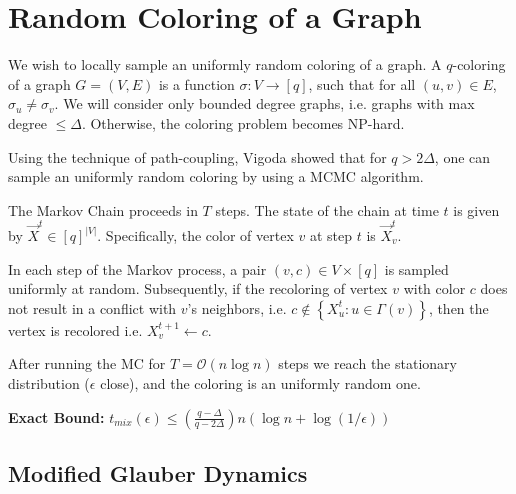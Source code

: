 \section{Random Coloring of a Graph}%
\label{sec:random_coloring_of_a_graph}

We wish to locally sample an uniformly random coloring of a graph.
A $q$-coloring of a graph $G = (V, E)$ is a function $\sigma : V\rightarrow [q]$,
such that for all $(u,v)\in E$, $\sigma_u \not= \sigma_v$.
We will consider only bounded degree graphs, i.e. graphs with max degree $\le \Delta$.
Otherwise, the coloring problem becomes NP-hard.

Using the technique of path-coupling, Vigoda  showed that for $q > 2\Delta$,
one can sample an uniformly random coloring by using a MCMC algorithm.

The Markov Chain proceeds in $T$ steps. The state of the chain at time $t$ is given by $\vec X^t\in [q]^{|V|}$.
Specifically, the color of vertex $v$ at step $t$ is $\vec X^t_v$.

In each step of the Markov process, a pair $(v, c)\in V\times [q]$ is sampled uniformly at random.
Subsequently, if the recoloring of vertex $v$ with color $c$ does not result in a conflict with $v$'s neighbors,
i.e. $c\not\in \left\{ X^t_u : u\in \Gamma(v)\right\}$, then the vertex is recolored i.e. $X_v^{t+1}\leftarrow c$.

After running the MC for $T = \mathcal{O}(n\log n)$ steps we reach the stationary distribution ($\epsilon$ close),
and the coloring is an uniformly random one.

\textbf{Exact Bound:}
$t_{mix}(\epsilon) \le \left( \frac{q-\Delta}{q-2\Delta}\right)n\left( \log n + \log(1/\epsilon)\right)$



\subsection{Modified Glauber Dynamics}%
\label{sec:modified_glauber_dynamics}

